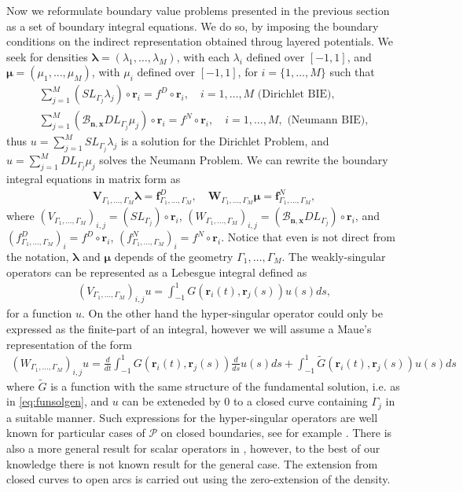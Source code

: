 \documentclass{article}
\newcommand{\bmu} {\bm{\mu}}
\newcommand{\bla}{\boldsymbol \lambda}
\newcommand{\bn}{\bm{n}}
\newcommand{\br}{\bm{r}}
\newcommand{\bx}{\bm{x}}
\begin{document}
Now we reformulate boundary value problems presented in the previous section as a set of boundary integral equations. We do so, by imposing the boundary conditions on the indirect representation obtained throug layered potentials. We seek for densities $\bla = (\lambda_1,\hdots,\lambda_M)$, with each $\lambda_i$ defined over $[-1,1]$, and $\bmu = (\mu_1, \hdots, \mu_M)$, with $\mu_i$ defined over $[-1,1]$, for $i = \{1,\hdots,M\}$ such that
\begin{align*}
\sum_{j=1}^M (SL_{\Gamma_j} \lambda_j )\circ \br_i = f^D\circ \br_i, \quad i = 1,\hdots,M \text{ (Dirichlet BIE)}, \\
\sum_{j=1}^M (\mathcal{B}_{\bn,\bx}DL_{\Gamma_j} \mu_j )\circ \br_i = f^N\circ \br_i, \quad i = 1,\hdots,M,
\text{ (Neumann BIE)},
\end{align*}
 thus $u = \sum_{j=1}^M SL_{\Gamma_j} \lambda_j $ is a solution for the Dirichlet Problem, and  $u = \sum_{j=1}^M DL_{\Gamma_j} \mu_j $ solves the Neumann Problem. We can rewrite the boundary integral equations in matrix form as 
\begin{align}
\label{eq:bios}
\mathbf{V}_{\Gamma_1,\hdots,\Gamma_M} \bla = \mathbf{f}^D_{\Gamma_1,\hdots,\Gamma_M}, \quad \mathbf{W}_{\Gamma_1,\hdots,\Gamma_M} \bmu = \mathbf{f}^N_{\Gamma_1,\hdots,\Gamma_M},
\end{align}
where $(V_{\Gamma_1,\hdots,\Gamma_M})_{i,j} = (SL_{\Gamma_j}  )\circ \br_i$, $(W_{\Gamma_1,\hdots,\Gamma_M})_{i,j} = (\mathcal{B}_{\bn,\bx}DL_{\Gamma_j} )\circ \br_i$, and $(f^D_{\Gamma_1,\hdots,\Gamma_M})_i = f^D \circ \br_i$, $(f^N_{\Gamma_1,\hdots,\Gamma_M})_i = f^N \circ \br_i$. Notice that even is not direct from the notation, $\bla$ and $\bmu$ depends of the geometry $\Gamma_1,\hdots,\Gamma_M$. The weakly-singular operators can be represented as a Lebesgue integral defined as 
\begin{align*}
(V_{\Gamma_1,\hdots,\Gamma_M})_{i,j}u = \int_{-1}^1G(\br_i(t),\br_j(s)) u(s) ds,
\end{align*}
for a function $u$. On the other hand the hyper-singular operator could only be expressed as the finite-part of an integral, however we will assume a Maue's representation of the form 
\begin{align}
\label{eq:mauesrep}
(W_{\Gamma_1,\hdots,\Gamma_M})_{i,j}u =  \frac{d}{dt}\int_{-1}^1G(\br_i(t),\br_j(s)) \frac{d}{ds}u(s) ds + 
\int_{-1}^1\widetilde{G}(\br_i(t),\br_j(s))u(s) ds
\end{align} 
where $\widetilde{G}$ is a function with the same structure of the fundamental solution, i.e. as in \eqref{eq:funsolgen}, and $u$ can be exteneded by 0 to a closed curve containing $\Gamma_j$ in a suitable manner. Such expressions for the hyper-singular operators are well known for particular cases of $\mathcal{P}$ on closed boundaries, see for example \cite{Nedelec1982,Maue1949}. There is also a more general result for scalar operators in \cite[Chapter 3.3.4]{Sauter:2011}, however, to the best of our knowledge there is not known result for the general case. The extension  from closed curves to open arcs is carried out using the zero-extension of the density. 
\end{document}
